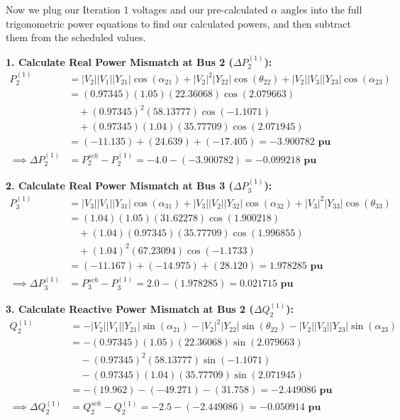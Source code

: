 \documentclass[11pt]{article}
\begin{document}
\begin{stepbox}
Now we plug our Iteration 1 voltages and our pre-calculated $\alpha$ angles into the full trigonometric power equations to find our calculated powers, and then subtract them from the scheduled values.

\textbf{1. Calculate Real Power Mismatch at Bus 2 ($\Delta P_2^{(1)}$):}
\begin{align*}
    P_2^{(1)} &= |V_2||V_1||Y_{21}|\cos(\alpha_{21}) + |V_2|^2|Y_{22}|\cos(\theta_{22}) + |V_2||V_3||Y_{23}|\cos(\alpha_{23}) \\[0.2cm]
    &= (0.97345)(1.05)(22.36068)\cos(2.079663) \\
    &\quad + (0.97345)^2(58.13777)\cos(-1.1071) \\
    &\quad + (0.97345)(1.04)(35.77709)\cos(2.071945) \\[0.2cm]
    &= (-11.135) + (24.639) + (-17.405) = \mathbf{-3.900782 \text{ pu}} \\[0.3cm]
    \implies \Delta P_2^{(1)} &= P_2^{sch} - P_2^{(1)} = -4.0 - (-3.900782) = \mathbf{-0.099218 \text{ pu}}
\end{align*}

\textbf{2. Calculate Real Power Mismatch at Bus 3 ($\Delta P_3^{(1)}$):}
\begin{align*}
    P_3^{(1)} &= |V_3||V_1||Y_{31}|\cos(\alpha_{31}) + |V_3||V_2||Y_{32}|\cos(\alpha_{32}) + |V_3|^2|Y_{33}|\cos(\theta_{33}) \\[0.2cm]
    &= (1.04)(1.05)(31.62278)\cos(1.900218) \\
    &\quad + (1.04)(0.97345)(35.77709)\cos(1.996855) \\
    &\quad + (1.04)^2(67.23094)\cos(-1.1733) \\[0.2cm]
    &= (-11.167) + (-14.975) + (28.120) = \mathbf{1.978285 \text{ pu}} \\[0.3cm]
    \implies \Delta P_3^{(1)} &= P_3^{sch} - P_3^{(1)} = 2.0 - (1.978285) = \mathbf{0.021715 \text{ pu}}
\end{align*}

\textbf{3. Calculate Reactive Power Mismatch at Bus 2 ($\Delta Q_2^{(1)}$):}
\begin{align*}
    Q_2^{(1)} &= -|V_2||V_1||Y_{21}|\sin(\alpha_{21}) - |V_2|^2|Y_{22}|\sin(\theta_{22}) - |V_2||V_3||Y_{23}|\sin(\alpha_{23}) \\[0.2cm]
    &= -(0.97345)(1.05)(22.36068)\sin(2.079663) \\
    &\quad - (0.97345)^2(58.13777)\sin(-1.1071) \\
    &\quad - (0.97345)(1.04)(35.77709)\sin(2.071945) \\[0.2cm]
    &= -(19.962) - (-49.271) - (31.758) = \mathbf{-2.449086 \text{ pu}} \\[0.3cm]
    \implies \Delta Q_2^{(1)} &= Q_2^{sch} - Q_2^{(1)} = -2.5 - (-2.449086) = \mathbf{-0.050914 \text{ pu}}
\end{align*}
\end{stepbox}
\end{document}
